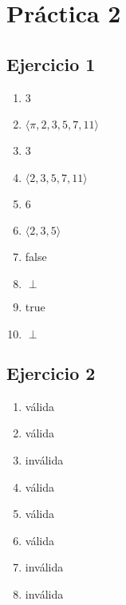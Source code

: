 
\usepackage{caratula}
\usepackage{enumerate}
\usepackage{hyperref}
\usepackage{graphicx}
\usepackage{amsfonts}
\usepackage{enumitem}

\decimalpoint
\hypersetup{colorlinks=true, linkcolor=black, urlcolor=blue}
\setlength{\parindent}{0em}
\setlength{\parskip}{0.5em}
\setcounter{tocdepth}{2} %
\setcounter{section}{1} %
\renewcommand{\thesubsubsection}{\thesubsection.\Alph{subsubsection}}
\graphicspath{ {images/} }





\maketitle
\newpage

\tableofcontents
\newpage

\section{Práctica 2}

\subsection{Ejercicio 1}

\begin{enumerate}[label=(\alph*)]
    \item 3
    \item $\langle \pi, 2, 3,5,7,11 \rangle$
    \item 3
    \item $\langle 2,3,5,7,11 \rangle$
    \item 6
    \item $\langle 2,3,5 \rangle$
    \item false
    \item $\perp$
    \item true
    \item $\perp$
\end{enumerate}

\subsection{Ejercicio 2}
\begin{enumerate}[label=(\alph*)]
    \item válida
    \item válida
    \item inválida
    \item válida
    \item válida
    \item válida
    \item inválida
    \item inválida
\end{enumerate}

